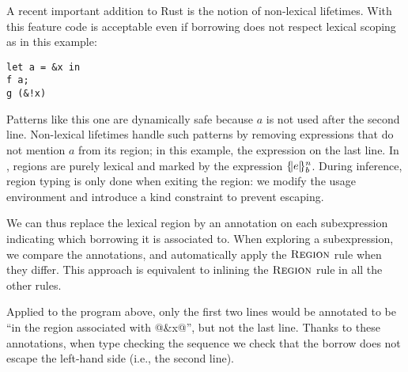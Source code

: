 A recent important addition to Rust is the notion of non-lexical lifetimes.
With this feature code is acceptable even if borrowing does not respect
lexical scoping as in this example:

\begin{lstlisting}
let a = &x in
f a;
g (&!x)
\end{lstlisting}

Patterns like this one are dynamically safe because $a$ is not used after
the second line.
Non-lexical lifetimes handle such patterns by removing expressions
that do not mention $a$ from its region; in this example,  the
expression on the last line.
%
In \lang, regions are purely lexical and marked by the
expression $\region{b}{e}$.
During inference, region typing is only done when exiting the region:
we modify the usage environment and introduce a kind constraint to prevent
escaping.

We can thus replace the lexical region by
an annotation on each subexpression indicating which borrowing it is associated
to. When exploring a subexpression, we compare the annotations, and automatically
apply the $\textsc{Region}$ rule when they differ.
%
This approach is equivalent to inlining the $\textsc{Region}$ rule in all the other
rules.

Applied to the program above, only the first two lines would be annotated
to be ``in the region associated with @&x@'', but not the last line.
Thanks to these annotations, when type checking the sequence we check
that the borrow does not escape the left-hand side (i.e., the second line).

\lstDeleteShortInline@


